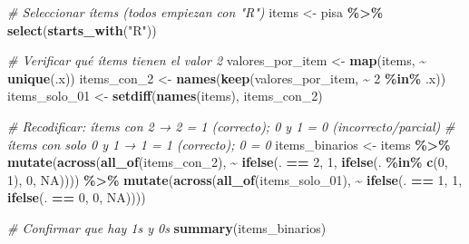 \documentclass[
]{article}
\newenvironment{Shaded}{\begin{snugshade}}{\end{snugshade}}
\newcommand{\CommentTok}[1]{\textcolor[rgb]{0.56,0.35,0.01}{\textit{#1}}}
\newcommand{\ConstantTok}[1]{\textcolor[rgb]{0.56,0.35,0.01}{#1}}
\newcommand{\DecValTok}[1]{\textcolor[rgb]{0.00,0.00,0.81}{#1}}
\newcommand{\FunctionTok}[1]{\textcolor[rgb]{0.13,0.29,0.53}{\textbf{#1}}}
\newcommand{\NormalTok}[1]{#1}
\newcommand{\OtherTok}[1]{\textcolor[rgb]{0.56,0.35,0.01}{#1}}
\newcommand{\SpecialCharTok}[1]{\textcolor[rgb]{0.81,0.36,0.00}{\textbf{#1}}}
\newcommand{\StringTok}[1]{\textcolor[rgb]{0.31,0.60,0.02}{#1}}
\begin{document}
\begin{Shaded}
\begin{Highlighting}[]
\CommentTok{\# Seleccionar ítems (todos empiezan con "R")}
\NormalTok{items }\OtherTok{\textless{}{-}}\NormalTok{ pisa }\SpecialCharTok{\%\textgreater{}\%} \FunctionTok{select}\NormalTok{(}\FunctionTok{starts\_with}\NormalTok{(}\StringTok{"R"}\NormalTok{))}

\CommentTok{\# Verificar qué ítems tienen el valor 2}
\NormalTok{valores\_por\_item }\OtherTok{\textless{}{-}} \FunctionTok{map}\NormalTok{(items, }\SpecialCharTok{\textasciitilde{}} \FunctionTok{unique}\NormalTok{(.x))}
\NormalTok{items\_con\_2 }\OtherTok{\textless{}{-}} \FunctionTok{names}\NormalTok{(}\FunctionTok{keep}\NormalTok{(valores\_por\_item, }\SpecialCharTok{\textasciitilde{}} \DecValTok{2} \SpecialCharTok{\%in\%}\NormalTok{ .x))}
\NormalTok{items\_solo\_01 }\OtherTok{\textless{}{-}} \FunctionTok{setdiff}\NormalTok{(}\FunctionTok{names}\NormalTok{(items), items\_con\_2)}

\CommentTok{\# Recodificar: ítems con 2 → 2 = 1 (correcto); 0 y 1 = 0 (incorrecto/parcial)}
\CommentTok{\#              ítems con solo 0 y 1 → 1 = 1 (correcto); 0 = 0}
\NormalTok{items\_binarios }\OtherTok{\textless{}{-}}\NormalTok{ items }\SpecialCharTok{\%\textgreater{}\%}
  \FunctionTok{mutate}\NormalTok{(}\FunctionTok{across}\NormalTok{(}\FunctionTok{all\_of}\NormalTok{(items\_con\_2), }\SpecialCharTok{\textasciitilde{}} \FunctionTok{ifelse}\NormalTok{(. }\SpecialCharTok{==} \DecValTok{2}\NormalTok{, }\DecValTok{1}\NormalTok{,}
                                       \FunctionTok{ifelse}\NormalTok{(. }\SpecialCharTok{\%in\%} \FunctionTok{c}\NormalTok{(}\DecValTok{0}\NormalTok{, }\DecValTok{1}\NormalTok{), }\DecValTok{0}\NormalTok{, }\ConstantTok{NA}\NormalTok{)))) }\SpecialCharTok{\%\textgreater{}\%}
  \FunctionTok{mutate}\NormalTok{(}\FunctionTok{across}\NormalTok{(}\FunctionTok{all\_of}\NormalTok{(items\_solo\_01), }\SpecialCharTok{\textasciitilde{}} \FunctionTok{ifelse}\NormalTok{(. }\SpecialCharTok{==} \DecValTok{1}\NormalTok{, }\DecValTok{1}\NormalTok{,}
                                         \FunctionTok{ifelse}\NormalTok{(. }\SpecialCharTok{==} \DecValTok{0}\NormalTok{, }\DecValTok{0}\NormalTok{, }\ConstantTok{NA}\NormalTok{))))}

\CommentTok{\# Confirmar que hay 1s y 0s}
\FunctionTok{summary}\NormalTok{(items\_binarios)}
\end{Highlighting}
\end{Shaded}
\end{document}
